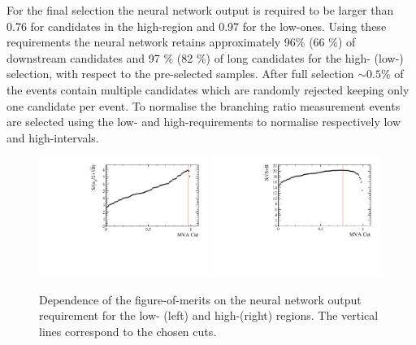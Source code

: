 For the final selection the neural network output is required to be larger than 0.76 for candidates in the high-\qsq region
and 0.97 for the low-\qsq ones. Using these requirements the neural network retains approximately 96\% (66 \%)
of downstream candidates and 97 \% (82 \%) of long candidates for the high- (low-) \qsq selection, with respect to
the pre-selected samples. After full selection $\sim 0.5$\% of the events contain multiple candidates
which are randomly rejected keeping only one candidate per event. 
%
%
To normalise the branching ratio measurement \jpsi events are selected using the low- and high-\qsq requirements
 to normalise respectively low and high-\qsq intervals. 
%
\begin{figure}
\centering
\includegraphics[width=0.49\textwidth]{Lmumu/figs/Lmumu_lowQ2_FoM.pdf}
\includegraphics[width=0.49\textwidth]{Lmumu/figs/Lmumu_highQ2_FoM.pdf}
\caption{Dependence of the figure-of-merits on the neural network output requirement for the low-\qsq
(left) and high-\qsq (right) regions. The vertical lines correspond to the chosen cuts.}
\label{fig:Lb_FOM}
\end{figure}
%
